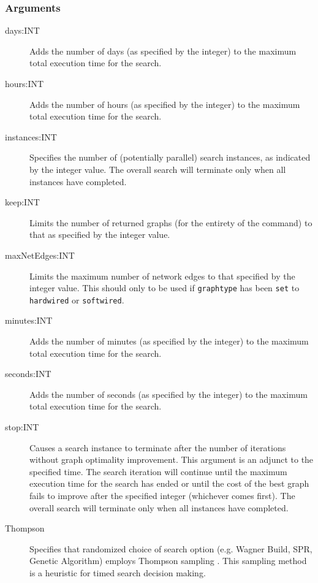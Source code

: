 	\subsubsection{Arguments}
	\begin{description}
		\item[days:INT] Adds the number of days (as specified by the integer) to the 
		maximum total execution time for the search.
		
		\item[hours:INT] Adds the number of hours (as specified by the integer) to the 
		maximum total execution time for the search.
		
		\item[instances:INT] Specifies the number of (potentially parallel) search instances,
		as indicated by the integer value.  The overall search will terminate only when  
		all instances have completed.
		
		\item[keep:INT] Limits the number of returned graphs (for the entirety of the command)  
		to that as specified by the 
		integer value.
		
		\item[maxNetEdges:INT] Limits the maximum number of network edges to that
		specified by the integer value. This should only to be used if \texttt{graphtype}
		has been \texttt{set} to \texttt{hardwired} or \texttt{softwired}. 
		
		\item[minutes:INT] Adds the number of minutes (as specified by the integer) to 
		the maximum total execution time for the search.
		
		\item[seconds:INT] Adds the number of seconds (as specified by the integer) to the 
		maximum total execution time for the search.

		\item[stop:INT] Causes a search instance to terminate after the number of iterations 
		without graph optimality improvement. This argument is an adjunct to the specified time. 
		The search iteration will continue until the maximum execution time for the search has ended
		or until the cost of the best graph fails to improve after the specified integer (whichever comes first).
		The overall search will terminate only when all instances have completed.
		
		\item[Thompson] Specifies that randomized choice of search option (e.g. Wagner 
		Build, SPR, Genetic Algorithm) employs Thompson sampling \citep{Thompson1933}. This
		sampling method is a heuristic for timed search decision making.
				

\end{description}
